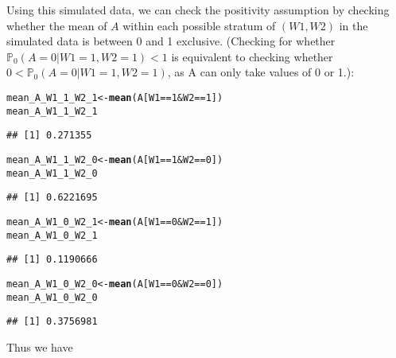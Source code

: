 \documentclass{article}\usepackage[]{graphicx}\usepackage[]{xcolor}
\makeatletter
\newcommand{\hlnum}[1]{\textcolor[rgb]{0.686,0.059,0.569}{#1}}%
\newcommand{\hlopt}[1]{\textcolor[rgb]{0,0,0}{#1}}%
\newcommand{\hlstd}[1]{\textcolor[rgb]{0.345,0.345,0.345}{#1}}%
\newcommand{\hlkwb}[1]{\textcolor[rgb]{0.69,0.353,0.396}{#1}}%
\newcommand{\hlkwd}[1]{\textcolor[rgb]{0.737,0.353,0.396}{\textbf{#1}}}%
\newenvironment{kframe}{%
 \def\at@end@of@kframe{}%
 \ifinner\ifhmode%
  \def\at@end@of@kframe{\end{minipage}}%
  \begin{minipage}{\columnwidth}%
 \fi\fi%
 \def\FrameCommand##1{\hskip\@totalleftmargin \hskip-\fboxsep
 \colorbox{shadecolor}{##1}\hskip-\fboxsep
     \hskip-\linewidth \hskip-\@totalleftmargin \hskip\columnwidth}%
 \MakeFramed {\advance\hsize-\width
   \@totalleftmargin\z@ \linewidth\hsize
   \@setminipage}}%
 {\par\unskip\endMakeFramed%
 \at@end@of@kframe}
\newenvironment{knitrout}{}{} %
\makeatother
\begin{document}
Using this simulated data, we can check the positivity assumption by checking whether the mean of $A$ within each possible stratum of $(W1, W2)$ in the simulated data is between 0 and 1 exclusive. (Checking for whether $\mathbb{P}_0(A=0|W1=1,W2=1)<1$ is equivalent to checking whether $0<\mathbb{P}_0(A=0|W1=1,W2=1)$, as A can only take values of 0 or 1.):
  
\begin{knitrout}
\color{fgcolor}\begin{kframe}
\begin{alltt}
\hlstd{mean_A_W1_1_W2_1} \hlkwb{<-} \hlkwd{mean}\hlstd{(A[W1} \hlopt{==} \hlnum{1} \hlopt{&} \hlstd{W2} \hlopt{==} \hlnum{1}\hlstd{])}
\hlstd{mean_A_W1_1_W2_1}
\end{alltt}
\begin{verbatim}
## [1] 0.271355
\end{verbatim}
\begin{alltt}
\hlstd{mean_A_W1_1_W2_0} \hlkwb{<-} \hlkwd{mean}\hlstd{(A[W1} \hlopt{==} \hlnum{1} \hlopt{&} \hlstd{W2} \hlopt{==} \hlnum{0}\hlstd{])}
\hlstd{mean_A_W1_1_W2_0}
\end{alltt}
\begin{verbatim}
## [1] 0.6221695
\end{verbatim}
\begin{alltt}
\hlstd{mean_A_W1_0_W2_1} \hlkwb{<-} \hlkwd{mean}\hlstd{(A[W1} \hlopt{==} \hlnum{0} \hlopt{&} \hlstd{W2} \hlopt{==} \hlnum{1}\hlstd{])}
\hlstd{mean_A_W1_0_W2_1}
\end{alltt}
\begin{verbatim}
## [1] 0.1190666
\end{verbatim}
\begin{alltt}
\hlstd{mean_A_W1_0_W2_0} \hlkwb{<-} \hlkwd{mean}\hlstd{(A[W1} \hlopt{==} \hlnum{0} \hlopt{&} \hlstd{W2} \hlopt{==} \hlnum{0}\hlstd{])}
\hlstd{mean_A_W1_0_W2_0}
\end{alltt}
\begin{verbatim}
## [1] 0.3756981
\end{verbatim}
\end{kframe}
\end{knitrout}


Thus we have 
\end{document}
